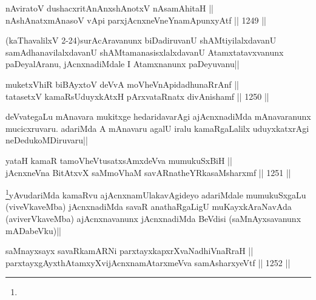 
\begin{shl}
nAviratoV dushacxritAnAnxshAnotxV nAsamAhitaH || \\
nAshAnatxmAnasoV vA\s pi parxjAcnxneVneYnamApunxyAtf ||  1249 ||  
\end{shl}

\begin{artha}
(kaThavalilxV 2-24)surAcAravanunx biDadiruvanU shAMtiyilalxdavanU samAdhanavilalxdavanU shAMtamanasisxlalxdavanU Atamxtatavxvanunx paDeyalAranu, jAcnxnadiMdale I Atamxnanunx paDeyuvanu||
\end{artha}


\begin{shl}
muketxVhiR biBAyxtoV deVvA moVheVnApidadhunaRrAnf || \\
tatasetxV kamaRsUduyxkAtxH pArxvataRnatx divAnishamf ||  1250 ||  
\end{shl}

\begin{artha}
deVvategaLu mAnavara mukitxge hedaridavarAgi ajAcnxnadiMda mAnavaranunx mucicxruvaru. adariMda A mAnavaru agalU iralu kamaRgaLalilx uduyxkatxrAgi neDedukoMDiruvaru||
\end{artha}


\begin{shl}
yataH kamaR tamoVheVtusatxsAmxdeVva mumukuSxBiH || \\
jAcnxneVna BitAtxvX saMmoVhaM savARnatheYRkasaMsharxmf ||  1251 ||  
\end{shl}

\begin{artha}
\footnote{}yAvudariMda kamaRvu ajAcnxnamUlakavAgideyo adariMdale mumukuSxgaLu (viveVkaveMba) jAcnxnadiMda savaR anathaRgaLigU muKayxkAraNavAda (aviverVkaveMba) ajAcnxnavanunx jAcnxnadiMda BeVdisi (saMnAyxsavanunx mADabeVku)||
\end{artha}


\begin{shl}
saMnayxsayx savaRkamARNi parxtayxkapxrXvaNadhiVnaRraH || \\
parxtayxgAyxthAtamxyXvijAcnxnamAtarxmeVva samAsharxyeVtf ||  1252 ||  
\end{shl}

